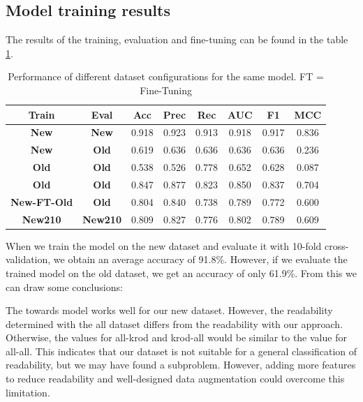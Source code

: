 \documentclass[%
class=scrreprt,
chapterprefix=false,%
open=right,%
twoside=false,%
paper=a4,%
logofile={Logo\_zentral\_farbig\_EN.png},%
thesistype=master,%
UKenglish,%
]{se2thesis}
\theoremstyle{definition}
\begin{document}
\subsection{Model training results} \label{Model training results}
	The results of the training, evaluation and fine-tuning can be found in the table \ref{tab:dataset_performance}.
	
	\begin{table}[h]
		\centering
		\begin{tabular}{|c|c|c|c|c|c|c|c|}
			\hline
			\textbf{Train} & \textbf{Eval} & \textbf{Acc} & \textbf{Prec} & \textbf{Rec} & \textbf{AUC} & \textbf{F1} & \textbf{MCC} \\
			\hline
			\textbf{New} 		& \textbf{New} 	& 0.918 & 0.923 & 0.913 & 0.918 & 0.917 & 0.836 \\
			\textbf{New} 		& \textbf{Old}  	& 0.619 & 0.636 & 0.636 & 0.636 & 0.636 & 0.236 \\
			\textbf{Old} 		& \textbf{Old} 	& 0.538 & 0.526 & 0.778 & 0.652 & 0.628 & 0.087 \\
			\textbf{Old}  		& \textbf{Old}  	& 0.847 & 0.877 & 0.823 & 0.850 & 0.837 & 0.704 \\
			
			\textbf{New-FT-Old}& \textbf{Old}  	& 0.804 & 0.840 & 0.738 & 0.789 & 0.772 & 0.600 \\
			\textbf{New210}  	& \textbf{New210}  & 0.809 & 0.827 & 0.776 & 0.802 & 0.789 & 0.609 \\
			\hline
		\end{tabular}
		\caption{Performance of different dataset configurations for the same model. FT = Fine-Tuning}
		\label{tab:dataset_performance}
	\end{table}
		
	When we train the model on the new dataset and evaluate it with 10-fold cross-validation, we obtain an average accuracy of 91.8\%. However, if we evaluate the trained model on the old dataset, we get an accuracy of only 61.9\%. From this we can draw some conclusions:
	
	The towards model works well for our new dataset. However, the readability determined with the all dataset differs from the readability with our approach. Otherwise, the values for all-krod and krod-all would be similar to the value for all-all. This indicates that our dataset is not suitable for a general classification of readability, but we may have found a subproblem. However, adding more features to reduce readability and well-designed data augmentation could overcome this limitation.
		
\end{document}
